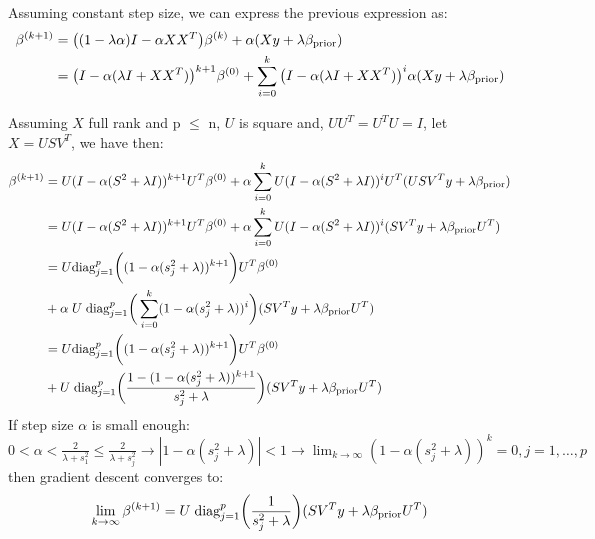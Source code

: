 \documentclass[12pt,twoside]{article}
\begin{document}
\begin{enumerate}
\medskip

Assuming constant step size, we can express the previous expression as:
\begin{align*}
		\beta^{(k+1)}	&=	\big( (1 - \lambda \alpha)  I - \alpha X X^T \big) \beta^{(k)}		+  	\alpha (X y + \lambda \beta_{\operatorname{prior}}) \\
					&=	\big(I - \alpha (\lambda I + X X^T)  \big)^{k+1} \beta^{(0)}		+	\sum_{i=0}^k \big(I - \alpha (\lambda I + X X^T)  \big)^i \alpha (X y + \lambda \beta_{\operatorname{prior}})
\end{align*}

Assuming $X$ full rank and p $\le$ n, $U$ is square and, $UU^T = U^TU = I$, let $X = USV^T$, we have then:
\begin{align*}
		\beta^{(k+1)}	&=	U (I - \alpha (S^2 + \lambda I))^{k+1} U^T \beta^{(0)}		+ \alpha \sum_{i=0}^k 	U (I - \alpha (S^2 + \lambda I))^ i U^T (U S V^T y +  \lambda \beta_{\operatorname{prior}}) \\
					&=	U (I - \alpha (S^2 + \lambda I))^{k+1} U^T \beta^{(0)}		+ \alpha \sum_{i=0}^k 	U (I - \alpha (S^2 + \lambda I))^ i (S V^T y + \lambda \beta_{\operatorname{prior}}  U^T) \\
					&=	U \text{diag}_{j=1}^p \bigg( (1 - \alpha (s_j^2 + \lambda))^{k+1} \bigg)U^T \beta^{(0)}	\\
					&+ \alpha \; U  \;  \text{diag}_{j=1}^p \bigg( \sum_{i=0}^k (1 - \alpha (s_j^2 + \lambda))^i \bigg)  (S V^T y + \lambda \beta_{\operatorname{prior}}  U^T) \\
					&= U \text{diag}_{j=1}^p \bigg( (1 - \alpha (s_j^2 + \lambda))^{k+1} \bigg)U^T \beta^{(0)}	\\
					&+ U  \;  \text{diag}_{j=1}^p \bigg( \frac{ 1 - (1 - \alpha (s_j^2 + \lambda))^{k+1}} {s_j^2 + \lambda} \bigg)  (S V^T y + \lambda \beta_{\operatorname{prior}}  U^T)
\end{align*}
If step size $\alpha$ is small enough: $0 < \alpha < \frac{2} {\lambda + s_1^2} \le \frac{2} {\lambda + s_j^2} \rightarrow |1 - \alpha (s_j^2 + \lambda)| < 1 \rightarrow \lim_{k \rightarrow \infty} (1 - \alpha (s_j^2 + \lambda))^k =0, j=1, \dots ,p $ then gradient descent converges to:
$$\lim_{k \rightarrow \infty} \beta^{(k+1)} = U  \;  \text{diag}_{j=1}^p \bigg( \frac{1} {s_j^2 + \lambda} \bigg)  (S V^T y + \lambda \beta_{\operatorname{prior}}  U^T)$$


\end{enumerate}
\end{document}

